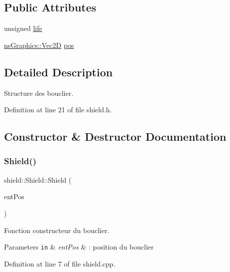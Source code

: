 \subsection*{Public Attributes}
\begin{DoxyCompactItemize}
\item 
unsigned \hyperlink{structshield_1_1_shield_aec13726342753b52ec6954b5ced3497d}{life}
\item 
\hyperlink{classns_graphics_1_1_vec2_d}{ns\+Graphics\+::\+Vec2D} \hyperlink{structshield_1_1_shield_aee8c1d30a8e23c2097048a04efe9d01b}{pos}
\end{DoxyCompactItemize}


\subsection{Detailed Description}
Structure des bouclier. 

Definition at line 21 of file shield.\+h.



\subsection{Constructor \& Destructor Documentation}
\mbox{\label{structshield_1_1_shield_addde44a42ca29e8d6474dbd52449aa40}} 
\subsubsection{\texorpdfstring{Shield()}{Shield()}}
{\footnotesize\ttfamily shield\+::\+Shield\+::\+Shield (\begin{DoxyParamCaption}\item[{const \hyperlink{classns_graphics_1_1_vec2_d}{ns\+Graphics\+::\+Vec2D} \&}]{ent\+Pos }\end{DoxyParamCaption})}



Fonction constructeur du bouclier. 


\begin{DoxyParams}[1]{Parameters}
\mbox{\tt in}  & {\em ent\+Pos} & \+: position du bouclier \\
\hline
\end{DoxyParams}


Definition at line 7 of file shield.\+cpp.




